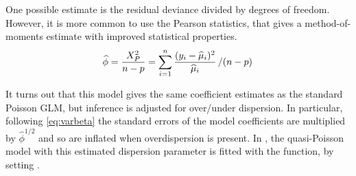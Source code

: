 \documentclass[11pt]{book}\usepackage[]{graphicx}\usepackage[]{color}
\begin{document}
One possible estimate is the residual deviance divided by degrees of freedom.
However, it is more common to use the Pearson statistics, that gives
a method-of-moments estimate with improved statistical properties.
\begin{equation*}
\widehat{\phi} =
\frac{X^2_P}{n-p} =
\sum_{i=1}^n \frac{(y_i - \widehat{\mu}_i)^2}{\widehat{\mu}_i} \left/ (n-p) \right.
\end{equation*}

It turns out that this model gives the same coefficient estimates as the standard
Poisson GLM, but inference is adjusted for over/under dispersion.
In particular, following \eqref{eq:varbeta}
the standard errors of the model coefficients are multiplied by
$\widehat{\phi}^{1/2}$ and so are inflated when overdispersion is present.
In \R, the quasi-Poisson model with this estimated dispersion parameter is
fitted with the  function, by setting .
\end{document}
